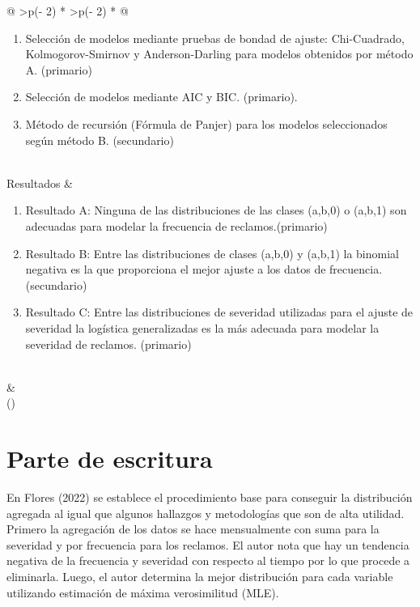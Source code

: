\documentclass[
  letterpaper,
  onepage,
  openany]{scrreprt}
\begin{document}
\begin{longtable}[]{@{}
  >{\centering\arraybackslash}p{(\columnwidth - 2\tabcolsep) * }
  >{\centering\arraybackslash}p{(\columnwidth - 2\tabcolsep) * }@{}}
\begin{minipage}[t]{\linewidth}
\begin{enumerate}
\item
  Selección de modelos mediante pruebas de bondad de ajuste:
  Chi-Cuadrado, Kolmogorov-Smirnov y Anderson-Darling para modelos
  obtenidos por método A. (primario)
\item
  Selección de modelos mediante AIC y BIC. (primario).
\item
  Método de recursión (Fórmula de Panjer) para los modelos seleccionados
  según método B. (secundario)
\end{enumerate}
\end{minipage} \\
Resultados & \begin{minipage}[t]{\linewidth}\centering
\begin{enumerate}
\def\labelenumi{\arabic{enumi}.}
\item
  Resultado A: Ninguna de las distribuciones de las clases (a,b,0) o
  (a,b,1) son adecuadas para modelar la frecuencia de
  reclamos.(primario)
\item
  Resultado B: Entre las distribuciones de clases (a,b,0) y (a,b,1) la
  binomial negativa es la que proporciona el mejor ajuste a los datos de
  frecuencia.(secundario)
\item
  Resultado C: Entre las distribuciones de severidad utilizadas para el
  ajuste de severidad la logística generalizadas es la más adecuada para
  modelar la severidad de reclamos. (primario)
\end{enumerate}
\end{minipage} \\
& \\
\bottomrule()
\end{longtable}

\hypertarget{parte-de-escritura-1}{%
\section{Parte de escritura}\label{parte-de-escritura-1}}

En Flores (2022) se establece el procedimiento base para conseguir la
distribución agregada al igual que algunos hallazgos y metodologías que
son de alta utilidad. Primero la agregación de los datos se hace
mensualmente con suma para la severidad y por frecuencia para los
reclamos. El autor nota que hay un tendencia negativa de la frecuencia y
severidad con respecto al tiempo por lo que procede a eliminarla. Luego,
el autor determina la mejor distribución para cada variable utilizando
estimación de máxima verosimilitud (MLE).
\end{document}
